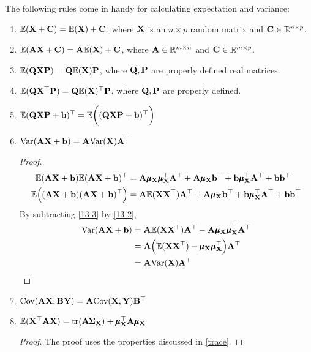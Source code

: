     \begin{Thm}
    The following rules come in handy for calculating expectation and variance:
    \begin{enumerate}
        \item $\E(\X + \B{C}) = \E(\X) + \B{C}$, where $\X$ is an $n \times p$ random matrix and $\B{C}\in \Rnp$.  
        \item $\E(\B{A}\X + \B{C}) = \B{A}\E(\X) + \B{C}$, where $\B{A}\in \mathbb{R}^{m\times n}$ and $\B{C}\in\mathbb{R}^{m\times p}$.
        \item $\E(\B{Q}\X\B{P}) = \B{Q}\E(\X)\B{P}$, where $\B{Q}, \B{P}$ are properly defined real matrices.
        \item $\E(\B{Q}\X^{\top}\B{P}) = \B{Q}\E(\X)^{\top}\B{P}$, where $\B{Q}, \B{P}$ are properly defined.
        \item $\E(\B{Q}\X\B{P} + \B{b})^{\top} = \E\bigg((\B{Q}\X\B{P} + \B{b})^{\top} \bigg)$
        \item $\Var(\B{A}\X + \B{b}) = \B{A}\Var(\X)\B{A}^{\top}$
        \begin{proof}
            \begin{align}
                \E(\B{A}\X + \B{b})\E(\B{A}\X + \B{b})^{\top} & = 
                \B{A}\muX{X}\muX{X}^{\top}\B{A}^{\top} + \B{A}\muX{X}\B{b}^{\top} + \B{b}\muX{X}^{\top}\B{A}^{\top} + \B{b}\B{b}^{\top}\label{13-2}\\
                \E\Bigl((\B{A}\X + \B{b})(\B{A}\X + \B{b})^{\top}\Bigr) &= \B{A}\E(\X\X^{\top})\B{A}^{\top} + \B{A}\muX{X}\B{b}^{\top} + \B{b}\muX{X}^{\top}\B{A}^{\top} + \B{b}\B{b}^{\top}\label{13-3}
            \end{align}
        By subtracting \cref{13-3} by \cref{13-2},
        \begin{align*}
            \Var(\B{A}\X + \B{b}) &= \B{A}\E(\X\X^{\top})\B{A}^{\top} - \B{A}\muX{X}\muX{X}^{\top}\B{A}^{\top}\\
            & = \B{A}\Big(\E(\X\X^{\top}) - \muX{X}\muX{X}^{\top} \Big)\B{A}^{\top}\\
            & = \B{A} \Var(\X) \B{A}^{\top}
        \end{align*}
        \end{proof}
        \item $\Cov(\B{A}\X, \B{B}\B{Y}) = \B{A}\Cov(\X, \B{Y})\B{B}^{\top}$
        \item $\E(\T{\B{X}}\B{A}\B{X}) = \tr(\B{A}\covmatX{X}) + \T{\muX{X}}\B{A}\muX{X}$
        \begin{proof}
            The proof uses the properties discussed in \cref{trace}.

\end{proof}
\end{enumerate}
\end{Thm}
